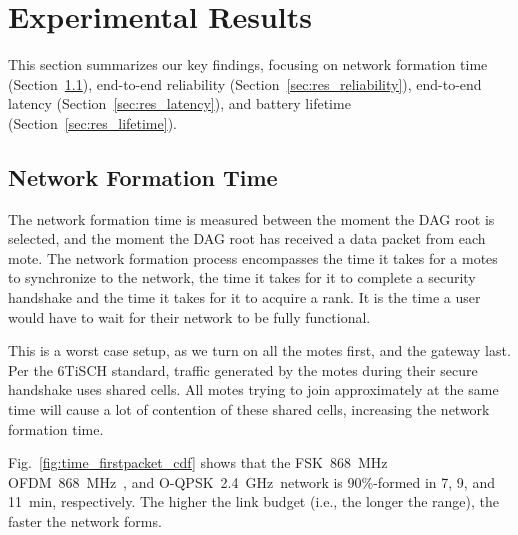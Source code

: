 \documentclass[sensors,article,submit,moreauthors,pdftex]{Definitions/mdpi}
\newcommand{\fsk}           {FSK~868~MHz}
\newcommand{\oqpsk}         {O-QPSK~2.4~GHz}
\newcommand{\ofdm}          {OFDM~868~MHz}
\begin{document}
\section{Experimental Results}
\label{sec:results}

This section summarizes our key findings, focusing on
    network formation time (Section~\ref{sec:res_formation}),
    end-to-end reliability (Section~\ref{sec:res_reliability}),
    end-to-end latency (Section~\ref{sec:res_latency}), and
    battery lifetime (Section~\ref{sec:res_lifetime}).

\subsection{Network Formation Time}
\label{sec:res_formation}


The network formation time is measured between the moment the DAG root is selected, and the moment the DAG root has received a data packet from each mote.
The network formation process encompasses
    the time it takes for a motes to synchronize to the network,
    the time it takes for it to complete a security handshake and
    the time it takes for it to acquire a rank.
It is the time a user would have to wait for their network to be fully functional.


This is a worst case setup, as we turn on all the motes first, and the gateway last.
Per the 6TiSCH standard, traffic generated by the motes during their secure handshake uses shared cells.
All motes trying to join approximately at the same time will cause a lot of contention of these shared cells, increasing the network formation time.


Fig.~\ref{fig:time_firstpacket_cdf} shows that the \fsk\, \ofdm\  , and \oqpsk\ network is 90\%-formed in 7, 9, and 11~min, respectively.
The higher the link budget (i.e., the longer the range), the faster the network forms.
\end{document}
